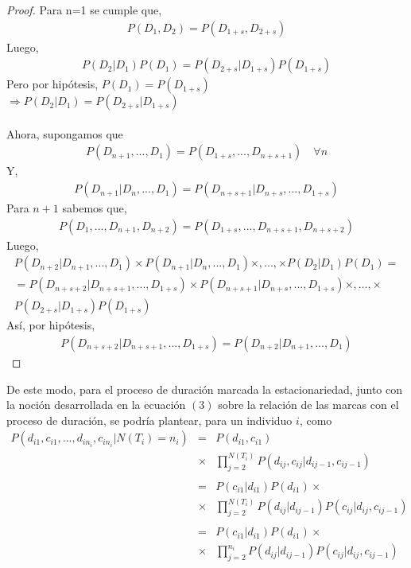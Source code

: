 \begin{proof}
Para n=1 se cumple que,\\
\begin{align*}
P(D_1,D_2)=P(D_{1+s},D_{2+s})
\end{align*}
Luego,\\
\begin{align*}
P(D_2|D_1)P(D_1)=P(D_{2+s}|D_{1+s})P(D_{1+s})
\end{align*}
Pero por hip\'otesis, $P(D_1)=P(D_{1+s})$\\
$\Rightarrow P(D_2|D_1)=P(D_{2+s}|D_{1+s})$\\
\\
Ahora, supongamos que
\begin{align*}
P(D_{n+1},...,D_1) = P(D_{1+s},...,D_{n+s+1}) \quad \forall n
\end{align*}
Y,
\begin{align*}
P(D_{n+1}|D_n,...,D_1)=P(D_{n+s+1}|D_{n+s},...,D_{1+s})
\end{align*}
Para $n+1$ sabemos que,
\begin{align*}
P(D_1,...,D_{n+1},D_{n+2})=P(D_{1+s},...,D_{n+s+1},D_{n+s+2})
\end{align*}
Luego,
\begin{multline*}
P(D_{n+2}|D_{n+1},...,D_1)\times P(D_{n+1}|D_n,...,D_1)\times,...,\times P(D_2|D_1)P(D_1) = \\
= P(D_{n+s+2}|D_{n+s+1},...,D_{1+s}) \times P(D_{n+s+1}|D_{n+s},...,D_{1+s}) \times,...,\times\\
P(D_{2+s}|D_{1+s})P(D_{1+s})
\end{multline*}
As\'i, por hip\'otesis,
\begin{align*}
P(D_{n+s+2}|D_{n+s+1},...,D_{1+s})=P(D_{n+2}|D_{n+1},...,D_1)
\end{align*}
\end{proof}
De este modo, para el proceso de duraci\'on marcada la estacionariedad, junto con la noci\'on desarrollada en la ecuaci\'on $(3)$ sobre la relaci\'on de las marcas con el proceso de duraci\'on, se podr\'ia plantear, para un individuo $i$, como
\begin{eqnarray*}
P(d_{i1},c_{i1},...,d_{in_i},c_{in_i}|N(T_i)=n_i)&=&P(d_{i1},c_{i1})\\
&\times& \prod_{j=2}^{N(T_i)} P(d_{ij},c_{ij}|d_{ij-1},c_{ij-1})\\
\\
                             &=&P(c_{i1}|d_{i1})P(d_{i1}) \times\\
                             &\times& \prod_{j=2}^{N(T_i)} P(d_{ij}|d_{ij-1})P(c_{ij}|d_{ij},c_{ij-1}) \\
                             \\
       &=& P(c_{i1}|d_{i1})P(d_{i1}) \times\\
       &\times& \prod_{j=2}^{n_i} P(d_{ij}|d_{ij-1})P(c_{ij}|d_{ij},c_{ij-1})                      
\end{eqnarray*}
